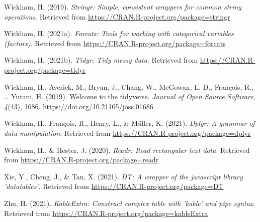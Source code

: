 \documentclass[
  english,
  man]{apa6}
\begin{document}
\leavevmode\hypertarget{ref-R-stringr}{}%
Wickham, H. (2019). \emph{Stringr: Simple, consistent wrappers for common string operations}. Retrieved from \url{https://CRAN.R-project.org/package=stringr}

\leavevmode\hypertarget{ref-R-forcats}{}%
Wickham, H. (2021a). \emph{Forcats: Tools for working with categorical variables (factors)}. Retrieved from \url{https://CRAN.R-project.org/package=forcats}

\leavevmode\hypertarget{ref-R-tidyr}{}%
Wickham, H. (2021b). \emph{Tidyr: Tidy messy data}. Retrieved from \url{https://CRAN.R-project.org/package=tidyr}

\leavevmode\hypertarget{ref-R-tidyverse}{}%
Wickham, H., Averick, M., Bryan, J., Chang, W., McGowan, L. D., François, R., \ldots{} Yutani, H. (2019). Welcome to the tidyverse. \emph{Journal of Open Source Software}, \emph{4}(43), 1686. \url{https://doi.org/10.21105/joss.01686}

\leavevmode\hypertarget{ref-R-dplyr}{}%
Wickham, H., François, R., Henry, L., \& Müller, K. (2021). \emph{Dplyr: A grammar of data manipulation}. Retrieved from \url{https://CRAN.R-project.org/package=dplyr}

\leavevmode\hypertarget{ref-R-readr}{}%
Wickham, H., \& Hester, J. (2020). \emph{Readr: Read rectangular text data}. Retrieved from \url{https://CRAN.R-project.org/package=readr}

\leavevmode\hypertarget{ref-R-DT}{}%
Xie, Y., Cheng, J., \& Tan, X. (2021). \emph{DT: A wrapper of the javascript library 'datatables'}. Retrieved from \url{https://CRAN.R-project.org/package=DT}

\leavevmode\hypertarget{ref-R-kableExtra}{}%
Zhu, H. (2021). \emph{KableExtra: Construct complex table with 'kable' and pipe syntax}. Retrieved from \url{https://CRAN.R-project.org/package=kableExtra}

\endgroup
\end{document}
